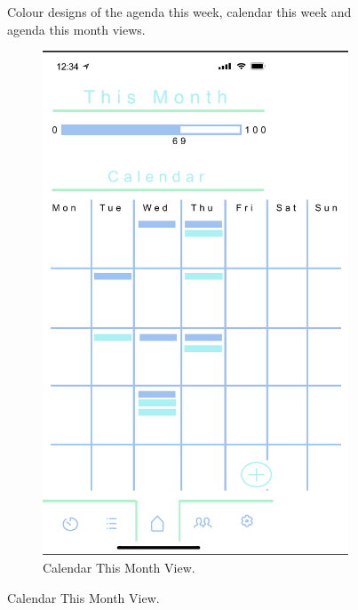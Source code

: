 \begin{figure}[H]
    \caption{Colour designs of the agenda this week, calendar this week and agenda this month views.}
    \label{fig:agendathisweek_calthisweek_agendathismonth_colour}
\end{figure}

\begin{figure}[H]
    \centering
    \begin{subfigure}[b]{0.3\textwidth}
        \centering
        \includegraphics[width=\textwidth]{./graphics/design/Dashboard - Calendar View - This Month.png}
        \caption{Calendar This Month View.}
        \label{fig:calendar_this_month_colour}
    \end{subfigure}

\end{figure}
